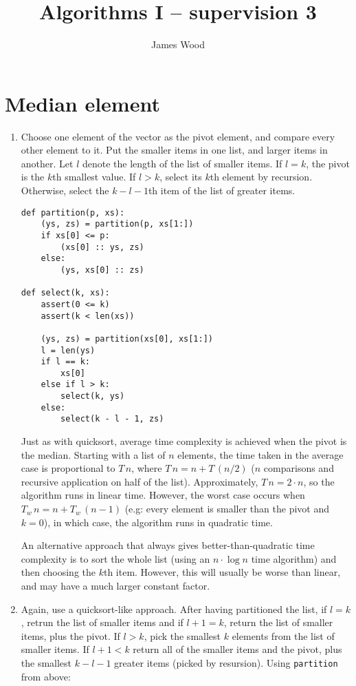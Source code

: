 \documentclass[11pt]{article}
\title{\textbf{Algorithms I -- supervision 3}}
\author{James Wood}
\begin{document}
\renewcommand{\labelenumi}{(\alph{enumi})}
\renewcommand{\labelenumii}{(\roman{enumii})}

\maketitle

\section{Median element}
\begin{enumerate}
\item
  Choose one element of the vector as the pivot element, and compare every other element to it. Put the smaller items in one list, and larger items in another. Let \(l\) denote the length of the list of smaller items. If \(l=k\), the pivot is the \(k\)th smallest value. If \(l>k\), select its \(k\)th element by recursion. Otherwise, select the \(k-l-1\)th item of the list of greater items.

  \begin{minipage}[t]{\linewidth}
    \begin{lstlisting}
def partition(p, xs):
    (ys, zs) = partition(p, xs[1:])
    if xs[0] <= p:
        (xs[0] :: ys, zs)
    else:
        (ys, xs[0] :: zs)

def select(k, xs):
    assert(0 <= k)
    assert(k < len(xs))

    (ys, zs) = partition(xs[0], xs[1:])
    l = len(ys)
    if l == k:
        xs[0]
    else if l > k:
        select(k, ys)
    else:
        select(k - l - 1, zs)
    \end{lstlisting}
  \end{minipage}
  Just as with quicksort, average time complexity is achieved when the pivot is the median. Starting with a list of \(n\) elements, the time taken in the average case is proportional to \(T\,n\), where \(T\,n=n+T\,(n/2)\) (\(n\) comparisons and recursive application on half of the list). Approximately, \(T\,n=2\cdot n\), so the algorithm runs in linear time. However, the worst case occurs when \(T_w\,n=n+T_w\,(n-1)\) (e.g: every element is smaller than the pivot and \(k=0\)), in which case, the algorithm runs in quadratic time.

  An alternative approach that always gives better-than-quadratic time complexity is to sort the whole list (using an \(n\cdot\log n\) time algorithm) and then choosing the \(k\)th item. However, this will usually be worse than linear, and may have a much larger constant factor.
\item
  Again, use a quicksort-like approach. After having partitioned the list, if \(l=k\), retrun the list of smaller items and if \(l+1=k\), return the list of smaller items, plus the pivot. If \(l>k\), pick the smallest \(k\) elements from the list of smaller items. If \(l+1<k\) return all of the smaller items and the pivot, plus the smallest \(k-l-1\) greater items (picked by resursion). Using \texttt{partition} from above:


\end{enumerate}
\end{document}
